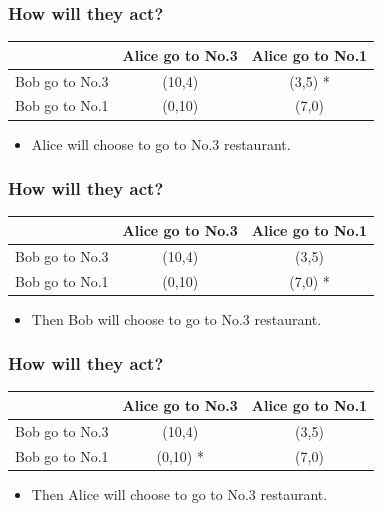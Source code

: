 \documentclass{beamer}
\begin{document}
\begin{frame}
\frametitle{How will they act?}
\begin{tabular}{|c|c|c|}
\hline
\hline
    & {\color{red}Alice} go to No.3 & {\color{red}Alice} go to No.1\\
\hline
{\color{blue}Bob} go to No.3 & ({\color{blue}10},{\color{red}4})& ({\color{blue}3},{\color{red}5})  {\color{green}*}\\
\hline
{\color{blue}Bob} go to No.1 & ({\color{blue}0},{\color{red}10}) & ({\color{blue}7},{\color{red}0})\\
\hline
\hline
\end{tabular}
\begin{itemize}
\item {\color{red}Alice} will choose to go to No.3 restaurant.
\end{itemize}
\end{frame}

\begin{frame}
\frametitle{How will they act?}
\begin{tabular}{|c|c|c|}
\hline
\hline
    & {\color{red}Alice} go to No.3 & {\color{red}Alice} go to No.1\\
\hline
{\color{blue}Bob} go to No.3 & ({\color{blue}10},{\color{red}4})& ({\color{blue}3},{\color{red}5})\\
\hline
{\color{blue}Bob} go to No.1 & ({\color{blue}0},{\color{red}10}) & ({\color{blue}7},{\color{red}0}) {\color{green}*}\\
\hline
\hline
\end{tabular}
\begin{itemize}
\item Then {\color{blue}Bob} will choose to go to No.3 restaurant.
\end{itemize}
\end{frame}

\begin{frame}
\frametitle{How will they act?}
\begin{tabular}{|c|c|c|}
\hline
\hline
    & {\color{red}Alice} go to No.3 & {\color{red}Alice} go to No.1\\
\hline
{\color{blue}Bob} go to No.3 & ({\color{blue}10},{\color{red}4})& ({\color{blue}3},{\color{red}5}) \\
\hline
{\color{blue}Bob} go to No.1 & ({\color{blue}0},{\color{red}10}) {\color{green}*} & ({\color{blue}7},{\color{red}0})\\
\hline
\hline
\end{tabular}
\begin{itemize}
\item Then {\color{red}Alice} will choose to go to No.3 restaurant.
\end{itemize}
\end{frame}
\end{document}
